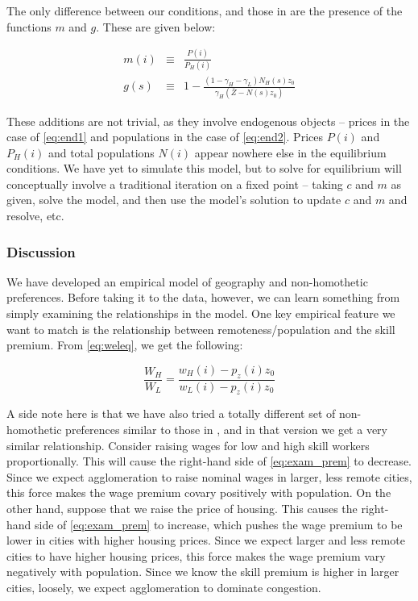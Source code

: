 \documentclass{article}
\begin{document}
The only difference between our conditions, and those in \citet{allen2014trade} are the presence of the functions $m$ and $g$.  These are given below:

\begin{eqnarray}
    \label{eq:end1}
	m(i)  & \equiv & \frac{P(i)}{P_H(i)} \\
    \label{eq:end2}
	g(s) & \equiv & 1- \frac{(1-\gamma_H -\gamma_L)N_H(s)z_0}{\gamma_H (\bar{Z}-N(s)z_0)}
\end{eqnarray}

These additions are not trivial, as they involve endogenous objects -- prices in the case of \eqref{eq:end1} and populations in the case of \eqref{eq:end2}.  Prices $P(i)$ and $P_H(i)$ and total populations $N(i)$ appear nowhere else in the equilibrium conditions.  We have yet to simulate this model, but to solve for equilibrium will conceptually involve a traditional iteration on a fixed point -- taking $c$ and $m$ as given, solve the model, and then use the model's solution to update $c$ and $m$ and resolve, etc.

\subsubsection{Discussion}

We have developed an empirical model of geography and non-homothetic preferences.  Before taking it to the data, however, we can learn something from simply examining the relationships in the model.  One key empirical feature we want to match is the relationship between remoteness/population and the skill premium.  From \eqref{eq:weleq}, we get the following:

\begin{equation}
	\frac{W_H}{W_L} = \frac{w_H(i)-p_z(i)z_0}{w_L(i)-p_z(i)z_0}
    \label{eq:exam_prem}
\end{equation}

A side note here is that we have also tried a totally different set of non-homothetic preferences similar to those in \citet{fajgelbaum2011income}, and in that version we get a very similar relationship.  Consider raising wages for low and high skill workers proportionally.  This will cause the right-hand side of \eqref{eq:exam_prem} to decrease.  Since we expect agglomeration to raise nominal wages in larger, less remote cities, this force makes the wage premium covary positively with population.  On the other hand, suppose that we raise the price of housing.  This causes the right-hand side of \eqref{eq:exam_prem} to increase, which pushes the wage premium to be lower in cities with higher housing prices.  Since we expect larger and less remote cities to have higher housing prices, this force makes the wage premium vary negatively with population.  Since we know the skill premium is higher in larger cities, loosely, we expect agglomeration to dominate congestion.
\end{document}
